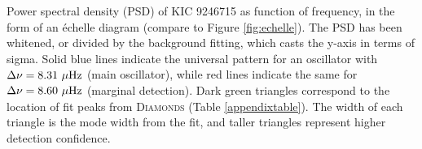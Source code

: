\label{fig:appendixfig}
Power spectral density (PSD) of KIC 9246715 as function of frequency, in the form of an \'echelle diagram (compare to Figure \ref{fig:echelle}). The PSD has been whitened, or divided by the background fitting, which casts the y-axis in terms of sigma. Solid blue lines indicate the universal pattern for an oscillator with $\Delta \nu = 8.31 \ \mu \rm{Hz}$ (main oscillator), while red lines indicate the same for $\Delta \nu = 8.60 \ \mu \rm{Hz}$ (marginal detection). Dark green triangles correspond to the location of fit peaks from \textsc{D\large{iamonds}} (Table \ref{appendixtable}). The width of each triangle is the mode width from the fit, and taller triangles represent higher detection confidence.